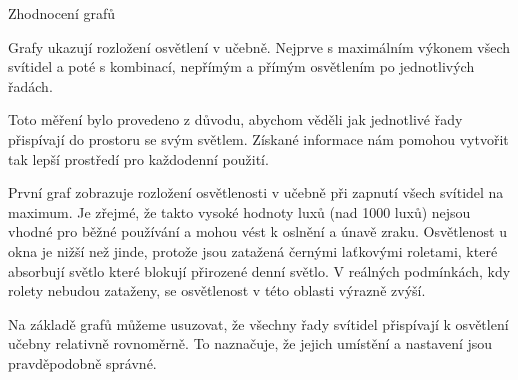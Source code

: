 
\medskip\noindent
{\sbf Zhodnocení grafů}

Grafy ukazují rozložení osvětlení v učebně. Nejprve s maximálním výkonem všech svítidel a poté s kombinací,
nepřímým a přímým osvětlením po jednotlivých řadách.



Toto měření bylo provedeno z důvodu, abychom věděli jak jednotlivé řady přispívají do prostoru se svým světlem.
Získané informace nám pomohou vytvořit tak lepší prostředí pro každodenní použití.

\medskip {}

První graf zobrazuje rozložení osvětlenosti v učebně při zapnutí všech svítidel na maximum. Je zřejmé, že takto vysoké hodnoty luxů (nad 1000 luxů)
nejsou vhodné pro běžné používání a mohou vést k oslnění a únavě zraku.
Osvětlenost u okna je nižší než jinde, protože jsou zatažená černými laťkovými roletami,
které absorbují světlo které blokují přirozené denní světlo.
V reálných podmínkách, kdy rolety nebudou zataženy, se osvětlenost v této oblasti výrazně zvýší.


\medskip {}


Na základě grafů můžeme usuzovat, že všechny řady svítidel přispívají k osvětlení učebny relativně rovnoměrně.
To naznačuje, že jejich umístění a nastavení jsou pravděpodobně správné.

\medskip {}

